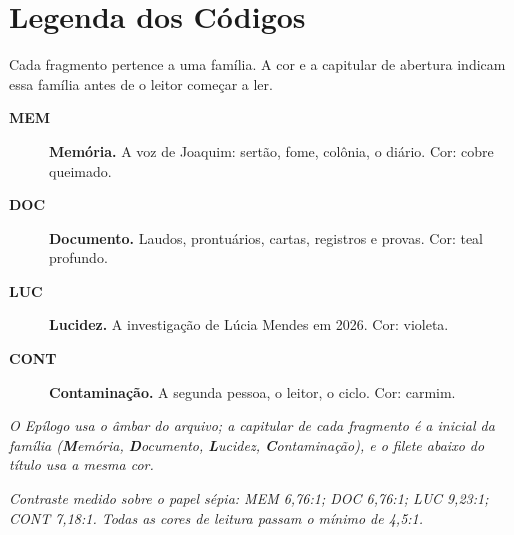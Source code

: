 \chapter*{Legenda dos Códigos}

\noindent Cada fragmento pertence a uma família. A cor e a capitular de abertura
indicam essa família antes de o leitor começar a ler.

\vspace{1.2em}
\begin{description}
  \item[\textcolor{mem}{\large\bfseries MEM}] \textbf{Memória.} A voz de Joaquim: sertão, fome, colônia, o diário. Cor: cobre queimado.
  \item[\textcolor{doc}{\large\bfseries DOC}] \textbf{Documento.} Laudos, prontuários, cartas, registros e provas. Cor: teal profundo.
  \item[\textcolor{luc}{\large\bfseries LUC}] \textbf{Lucidez.} A investigação de Lúcia Mendes em 2026. Cor: violeta.
  \item[\textcolor{cont}{\large\bfseries CONT}] \textbf{Contaminação.} A segunda pessoa, o leitor, o ciclo. Cor: carmim.
\end{description}

\vspace{1.2em}
\noindent\textit{O Epílogo usa o âmbar do arquivo; a capitular de cada fragmento é a inicial da
família (\textbf{M}emória, \textbf{D}ocumento, \textbf{L}ucidez,
\textbf{C}ontaminação), e o filete abaixo do título usa a mesma cor.}

\vspace{1em}
\noindent\textit{Contraste medido sobre o papel sépia: MEM 6,76:1; DOC 6,76:1;
LUC 9,23:1; CONT 7,18:1. Todas as cores de leitura passam o mínimo de 4,5:1.}

